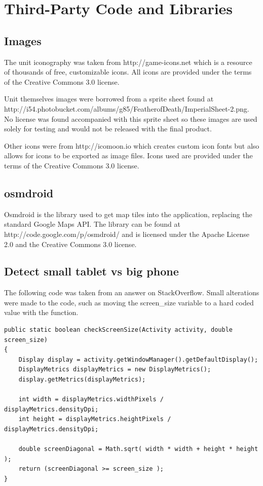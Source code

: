 \chapter{Third-Party Code and Libraries}

\section{Images}
The unit iconography was taken from http://game-icons.net which is a resource of thousands of free, customizable icons. All icons are provided under the terms of the Creative Commons 3.0 license.

Unit themselves images were borrowed from a sprite sheet found at\\ http://i54.photobucket.com/albums/g85/FeatherofDeath/ImperialSheet-2.png. No license was found accompanied with this sprite sheet so these images are used solely for testing and would not be released with the final product.

Other icons were from http://icomoon.io which creates custom icon fonts but also allows for icons to be exported as image files. Icons used are provided under the terms of the Creative Commons 3.0 license.

\section{osmdroid}
Osmdroid is the library used to get map tiles into the application, replacing the standard Google Maps API. The library can be found at http://code.google.com/p/osmdroid/ and is licensed under the Apache License 2.0 and the Creative Commons 3.0 license.

\newpage

\section{Detect small tablet vs big phone}
The following code was taken from an answer on StackOverflow\cite{istablet}. Small alterations were made to the code, such as moving the screen\_size variable to a hard coded value with the function.

\begin{lstlisting}
public static boolean checkScreenSize(Activity activity, double screen_size)
{
    Display display = activity.getWindowManager().getDefaultDisplay();
    DisplayMetrics displayMetrics = new DisplayMetrics();
    display.getMetrics(displayMetrics);

    int width = displayMetrics.widthPixels / displayMetrics.densityDpi;
    int height = displayMetrics.heightPixels / displayMetrics.densityDpi;

    double screenDiagonal = Math.sqrt( width * width + height * height );
    return (screenDiagonal >= screen_size );
}
\end{lstlisting}


